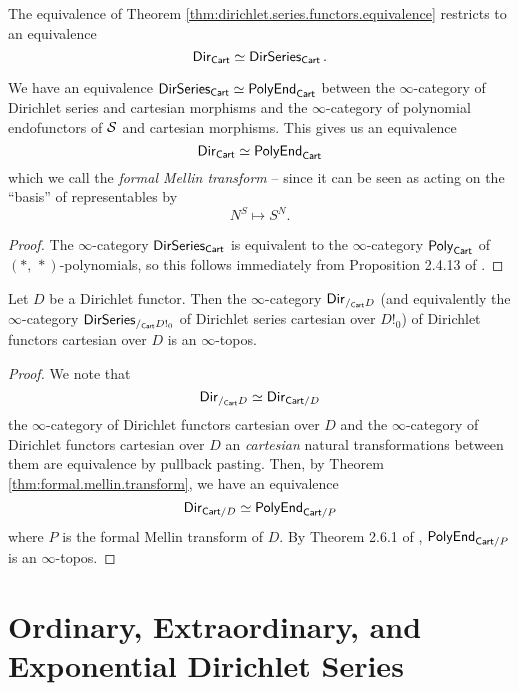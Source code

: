 \begin{prop}
The equivalence of Theorem \ref{thm:dirichlet.series.functors.equivalence}
restricts to an equivalence
$$\operatorname{\mathsf{{Dir}}}_{\mathsf{{Cart}}} \simeq \operatorname{\mathsf{{DirSeries}}}_{\mathsf{{Cart}}}.$$
\end{prop}

\begin{thm}\label{thm:formal.mellin.transform}
We have an equivalence $\operatorname{\mathsf{{DirSeries}}}_{\mathsf{{Cart}}} \simeq
\mathsf{{PolyEnd}}_{\mathsf{{Cart}}}$ between the $\infty$-category of Dirichlet series
and cartesian morphisms and the $\infty$-category of polynomial endofunctors of
$\operatorname{\mathcal{S}}$ and cartesian morphisms. This gives us an equivalence
$$\operatorname{\mathsf{{Dir}}}_{\mathsf{{Cart}}} \simeq \mathsf{{PolyEnd}}_{\mathsf{{Cart}}}$$
which we call the \emph{formal Mellin transform} -- since it can be seen as
acting on the ``basis'' of representables by
$$N^S \mapsto S^N.$$
\end{thm}
\begin{proof}
The $\infty$-category $\operatorname{\mathsf{{DirSeries}}}_{\mathsf{{Cart}}}$ is equivalent to the $\infty$-category
$\mathsf{{Poly}}_{\mathsf{{Cart}}}$ of $(\ast,\, \ast)$-polynomials, so this follows immediately from Proposition 2.4.13 of \cite{GHK:Analytic.Monads}.
\end{proof}

\begin{cor}
Let $D$ be a Dirichlet functor. Then the $\infty$-category $\operatorname{\mathsf{{Dir}}}_{/_{\mathsf{{Cart}}} D}$
(and equivalently the $\infty$-category $\operatorname{\mathsf{{DirSeries}}}_{/_{\mathsf{{Cart}}} D!_0}$ of
Dirichlet series cartesian over $D!_0$) of
Dirichlet functors cartesian over $D$ is an $\infty$-topos.
\end{cor}
\begin{proof}
  We note that
  $$\operatorname{\mathsf{{Dir}}}_{/_{\mathsf{{Cart}}} D} \simeq \operatorname{\mathsf{{Dir}}}_{\mathsf{{Cart}}/D}$$
  the $\infty$-category of Dirichlet functors cartesian over $D$ and the
  $\infty$-category of Dirichlet functors cartesian over $D$ an \emph{cartesian}
  natural transformations between them are equivalence by pullback pasting.
  Then, by Theorem \ref{thm:formal.mellin.transform}, we have an equivalence
  $$\operatorname{\mathsf{{Dir}}}_{\mathsf{{Cart}}/D} \simeq \mathsf{{PolyEnd}}_{\mathsf{{Cart}}/P}$$
  where $P$ is the formal Mellin transform of $D$. By Theorem 2.6.1 of
  \cite{GHK:Analytic.Monads}, $\mathsf{{PolyEnd}}_{\mathsf{{Cart}}/P}$ is an $\infty$-topos.
\end{proof}

\section{Ordinary, Extraordinary, and Exponential Dirichlet Series}

